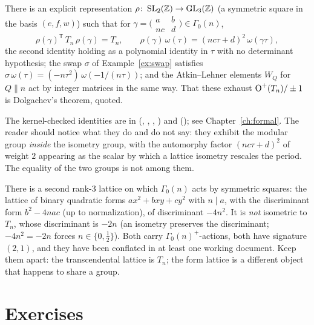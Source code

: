 \begin{proposition}\label{prop:rho}
There is an explicit representation $\rho\colon\operatorname{SL}_2(\mathbb{Z})\to\operatorname{GL}_3(\mathbb{Z})$
(a symmetric square in the basis $(e,f,w)$) such that for
$\gamma=\bigl(\begin{smallmatrix}a&b\\nc&d\end{smallmatrix}\bigr)\in\Gamma_0(n)$,
\[
  \rho(\gamma)^{\mathsf T}\,T_n\,\rho(\gamma)=T_n,\qquad
  \rho(\gamma)\,\omega(\tau)=(nc\tau+d)^2\,\omega(\gamma\tau),
\]
the second identity holding as a polynomial identity in $\tau$ with no
determinant hypothesis; the swap $\sigma$ of Example~\ref{ex:swap} satisfies
$\sigma\,\omega(\tau)=(-n\tau^2)\,\omega(-1/(n\tau))$; and the Atkin--Lehner
elements $W_Q$ for $Q\parallel n$ act by integer matrices in the same way.
That these exhaust $\operatorname{O}^+(T_n)/\pm1$ is Dolgachev's theorem, quoted.
\end{proposition}

The kernel-checked identities are in 
(, , ,
) and  ();
see Chapter~\ref{ch:formal}. The reader should notice what they do and do not
say: they exhibit the modular group \emph{inside} the isometry group, with the
automorphy factor $(nc\tau+d)^2$ of weight $2$ appearing as the scalar by
which a lattice isometry rescales the period. The equality of the two groups
is not among them.

\begin{remark}\label{rem:two-lattices}
There is a second rank-3 lattice on which $\Gamma_0(n)$ acts by symmetric
squares: the lattice of binary quadratic forms $ax^2+bxy+cy^2$ with $n\mid a$,
with the discriminant form $b^2-4nac$ (up to normalization), of discriminant
$-4n^2$. It is \emph{not} isometric to $T_n$, whose discriminant is $-2n$
(an isometry preserves the discriminant; $-4n^2=-2n$ forces $n\in\{0,\tfrac12\}$).
Both carry $\Gamma_0(n)^+$-actions, both have signature $(2,1)$, and they have
been conflated in at least one working document. Keep them apart: the
transcendental lattice is $T_n$; the form lattice is a different object that
happens to share a group.
\end{remark}

\section{Exercises}

